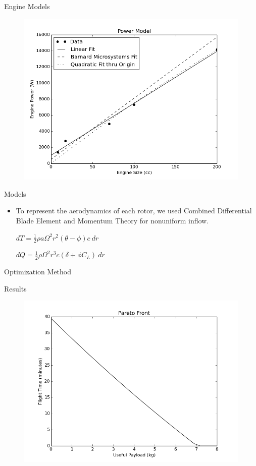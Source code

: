 \documentclass{beamer}
\begin{document}
\begin{frame}{Engine Models}	
	\begin{figure}
		\begin{center}
			\includegraphics[width=.70\textwidth]{../max_power.png}
			\label{fig:eng_power}
		\end{center}
	\end{figure}
	
\end{frame}

\begin{frame}{Models}
	\begin{itemize}
		\item{To represent the aerodynamics of each rotor, we used Combined Differential Blade Element and Momentum Theory for nonuniform inflow.}
		\begin{center}
		$ dT = \frac{1}{2} \rho a \Omega^2 r^2 (\theta - \phi) c \  dr $
		
		$ dQ = \frac{1}{2} \rho \Omega^2 r^3 c (\delta + \phi C_L) \ dr $
		\end{center}
	\end{itemize}

\end{frame}

\begin{frame}{Optimization Method}

\end{frame}

\begin{frame}{Results}
	\begin{figure}
		\begin{center}
			\includegraphics[width=.70\textwidth]{../pareto_front.png}
			\label{fig:pareto}
		\end{center}
	\end{figure}
\end{frame}
\end{document}
